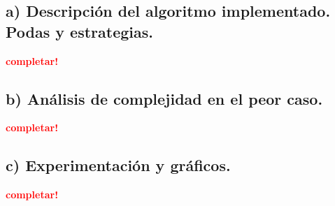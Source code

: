 \subsection{a) Descripción del algoritmo implementado. Podas y estrategias.}
\vspace*{0.3cm}
\textcolor{red}{\textbf{completar!}}



\newpage
\subsection{b) Análisis de complejidad en el peor caso.}
\vspace*{0.3cm}
\textcolor{red}{\textbf{completar!}}



\newpage
\subsection{c) Experimentación y gráficos.}
\vspace*{0.3cm}
\textcolor{red}{\textbf{completar!}}

